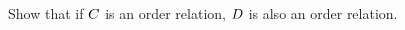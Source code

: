 \documentclass[main.tex]{subfiles}
\begin{document}
\subproblem{}\label{s03p14b}

Show that if \({C}\) is an order relation, \({D}\) is
also an order relation.

\todo{}
\end{document}
